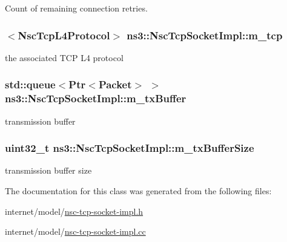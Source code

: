 Count of remaining connection retries. 

\subsubsection[{\texorpdfstring{m\+\_\+tcp}{m_tcp}}]{$<${\bf Nsc\+Tcp\+L4\+Protocol}$>$ ns3\+::\+Nsc\+Tcp\+Socket\+Impl\+::m\+\_\+tcp\hspace{0.3cm}{\ttfamily [private]}}\hypertarget{classns3_1_1NscTcpSocketImpl_adbb82752a7cb95d4f3e53f5ed17786f5}{}\label{classns3_1_1NscTcpSocketImpl_adbb82752a7cb95d4f3e53f5ed17786f5}


the associated T\+CP L4 protocol 

\subsubsection[{\texorpdfstring{m\+\_\+tx\+Buffer}{m_txBuffer}}]{\setlength{\rightskip}{0pt plus 5cm}std\+::queue$<${\bf Ptr}$<${\bf Packet}$>$ $>$ ns3\+::\+Nsc\+Tcp\+Socket\+Impl\+::m\+\_\+tx\+Buffer\hspace{0.3cm}{\ttfamily [private]}}\hypertarget{classns3_1_1NscTcpSocketImpl_ac39f7bbdc24d72c54744db1943d927dd}{}\label{classns3_1_1NscTcpSocketImpl_ac39f7bbdc24d72c54744db1943d927dd}


transmission buffer 

\subsubsection[{\texorpdfstring{m\+\_\+tx\+Buffer\+Size}{m_txBufferSize}}]{\setlength{\rightskip}{0pt plus 5cm}uint32\+\_\+t ns3\+::\+Nsc\+Tcp\+Socket\+Impl\+::m\+\_\+tx\+Buffer\+Size\hspace{0.3cm}{\ttfamily [private]}}\hypertarget{classns3_1_1NscTcpSocketImpl_a0adc703cbdbc880fb7ddbd587abc3aa8}{}\label{classns3_1_1NscTcpSocketImpl_a0adc703cbdbc880fb7ddbd587abc3aa8}


transmission buffer size 



The documentation for this class was generated from the following files\+:\begin{DoxyCompactItemize}
\item 
internet/model/\hyperlink{nsc-tcp-socket-impl_8h}{nsc-\/tcp-\/socket-\/impl.\+h}\item 
internet/model/\hyperlink{nsc-tcp-socket-impl_8cc}{nsc-\/tcp-\/socket-\/impl.\+cc}\end{DoxyCompactItemize}
